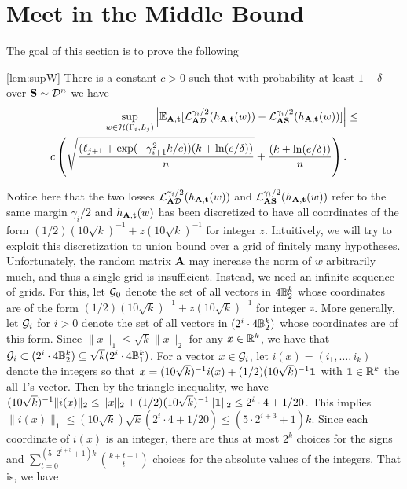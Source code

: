\section{Meet in the Middle Bound}
\label{sec:meetinmid}
The goal of this section is to prove the following
\begin{customlem}{\ref{lem:supW}}
There is a constant $c>0$ such that with probability at least $1-\delta$ over $\mathbf{S} \sim \mathcal{D}^n$ we have
\begin{align*}
    \sup_{w \in \mathcal{H}(\Gamma_i,L_j)} \left|\mathbb{E}_{\mathbf{A},\mathbf{t}} [\mathcal{L}^{\gamma_i/2}_{\mathbf{A} \mathcal{D}}(h_{\mathbf{A},\mathbf{t}}(w)) - \mathcal{L}^{\gamma_i/2}_{\mathbf{A} \mathbf{S}}(h_{\mathbf{A},\mathbf{t}}(w))]\right| &\leq\\ c \left(\sqrt{\frac{(\ell_{j+1}+ \exp(-\gamma_{i+1}^2k/c)) (k + \ln(e/\delta))}{n}} + \frac{(k + \ln(e/\delta))}{n} \right).
\end{align*}
\end{customlem}
Notice here that the two losses $\mathcal{L}^{\gamma_i/2}_{\mathbf{A} \mathcal{D}}(h_{\mathbf{A},\mathbf{t}}(w))$ and $\mathcal{L}^{\gamma_i/2}_{\mathbf{A} \mathbf{S}}(h_{\mathbf{A},\mathbf{t}}(w))$ refer to the same margin $\gamma_i/2$ and $h_{\mathbf{A},\mathbf{t}}(w)$ has been discretized to have all coordinates of the form $(1/2)(10 \sqrt{k})^{-1} + z (10 \sqrt{k})^{-1}$ for integer $z$. Intuitively, we will try to exploit this discretization to union bound over a grid of finitely many hypotheses. Unfortunately, the random matrix $\mathbf{A}$ may increase the norm of $w$ arbitrarily much, and thus a single grid is insufficient. Instead, we need an infinite sequence of grids. For this, let $\mathcal{G}_0$ denote the set of all vectors in $4 \mathbb{B}_2^k$ whose coordinates are of the form $(1/2)(10 \sqrt{k})^{-1} + z(10 \sqrt{k})^{-1}$ for integer $z$. More generally, let $\mathcal{G}_i$ for $i > 0$ denote the set of all vectors in $(2^i \cdot 4 \mathbb{B}_2^k)$ whose coordinates are of this form. Since $\|x\|_1 \leq \sqrt{k} \|x\|_2$ for any $x \in \mathbb{R}^k$, we have that $\mathcal{G}_i \subset (2^i \cdot 4 \mathbb{B}_2^k) \subseteq \sqrt{k}(2^i \cdot 4 \mathbb{B}_1^k)$. For a vector $x \in \mathcal{G}_i$, let $i(x)=(i_1,\dots,i_k)$ denote the integers so that $x = (10 \sqrt{k})^{-1} i(x) + (1/2)(10 \sqrt{k})^{-1} \mathbf{1}$ with $\mathbf{1} \in \mathbb{R}^k$ the all-1's vector. Then by the triangle inequality, we have $(10 \sqrt{k})^{-1}\|i(x)\|_2 \leq \|x\|_2 + (1/2)(10 \sqrt{k})^{-1}\|\mathbf{1}\|_2 \leq 2^i \cdot 4 + 1/20$. This implies $\|i(x)\|_1 \leq (10 \sqrt{k}) \sqrt{k} (2^i \cdot 4 + 1/20) \leq (5 \cdot 2^{i+3}+1)k$. Since each coordinate of $i(x)$ is an integer, there are thus at most $2^k$ choices for the signs and $\sum_{t=0}^{(5 \cdot 2^{i+3}+1)k} \binom{k + t -1}{t}$ choices for the absolute values of the integers. That is, we have

